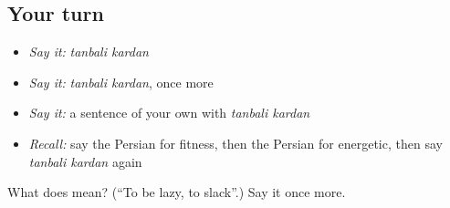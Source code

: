 \subsection*{Your turn}
\begin{itemize}
\raggedright
  \item \emph{Say it:} \emph{tanbali kardan}
  \item \emph{Say it:} \emph{tanbali kardan}, once more
  \item \emph{Say it:} a sentence of your own with \emph{tanbali kardan}
  \item \emph{Recall:} say the Persian for fitness, then the Persian for energetic, then say \emph{tanbali kardan} again
\end{itemize}

\begin{tcolorbox}[breakable,colback=teal!4,colframe=teal!35!black,title={Before you move on}]
What does   mean? (\textquotedblleft{}To be lazy, to slack\textquotedblright{}.) Say it once more.
\end{tcolorbox}
